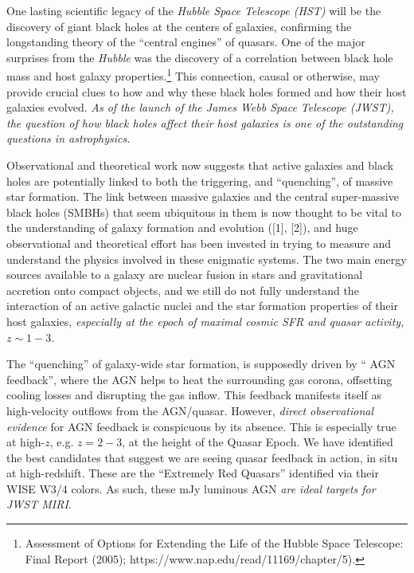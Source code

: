One lasting scientific legacy of the {\it Hubble Space Telescope
(HST)} will be the discovery of giant black holes at the centers of
galaxies, confirming the longstanding theory of the ``central
engines'' of quasars.  One of the major surprises from the {\it
Hubble} was the discovery of a correlation between black hole mass and
host galaxy properties.\footnote{Assessment of Options for Extending
the Life of the Hubble Space Telescope: Final Report (2005);
https://www.nap.edu/read/11169/chapter/5).}  This connection, causal
or otherwise, may provide crucial clues to how and why these black
holes formed and how their host galaxies evolved. {\it As of the
launch of the James Webb Space Telescope (JWST), the question of how
black holes affect their host galaxies is one of the outstanding
questions in astrophysics.}

\smallskip \smallskip
\noindent
Observational and theoretical work now suggests that active galaxies
and black holes are potentially linked to both the triggering, and
``quenching'', of massive star formation. The link between massive
galaxies and the central super-massive black holes (SMBHs) that seem
ubiquitous in them is now thought to be vital to the understanding of
galaxy formation and evolution ([1], [2]), and huge observational and
theoretical effort has been invested in trying to measure and
understand the physics involved in these enigmatic systems.  The two
main energy sources available to a galaxy are nuclear fusion in stars
and gravitational accretion onto compact objects, and we still do not
fully understand the interaction of an active galactic nuclei and the
star formation properties of their host galaxies, {\it especially at
the epoch of maximal cosmic SFR and quasar activity, $z\sim1-3$.}

\smallskip \smallskip
\noindent
The ``quenching'' of galaxy-wide star formation, is supposedly driven
by `` AGN feedback'', where the AGN helps to heat the surrounding gas
corona, offsetting cooling losses and disrupting the gas inflow. This
feedback manifests itself as high-velocity outflows from the
AGN/quasar.  However, {\it direct observational evidence} for AGN
feedback is conspicuous by its absence. This is especially true at
high-$z$, e.g. $z=2-3$, at the height of the Quasar Epoch.  We have
identified the best candidates that suggest we are seeing quasar
feedback in action, in situ at high-redshift. These are the
``Extremely Red Quasars'' identified via their WISE W3/4 colors.  As
such, these mJy luminous AGN {\it are ideal targets for JWST
MIRI}.




